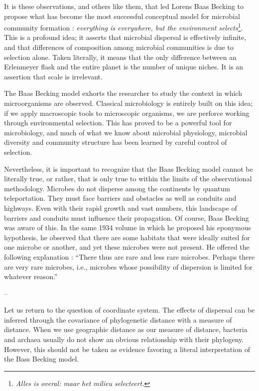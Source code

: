 It is these observations, and others like them, that led Lorens Baas Becking to propose what has become the most successful conceptual model for microbial community formation : {\em everything is everywhere, but the environment selects}\footnote{{\em Alles is overal: maar het milieu selecteert.}}. This is a profound idea; it asserts that microbial dispersal is effectively infinite, and that differences of composition among microbial communities is due to selection alone. Taken literally, it means that the only difference between an Erlenmeyer flask and the entire planet is the number of unique niches. It is an assertion that scale is irrelevant.

The Baas Becking model exhorts the researcher to study the context in which microorganisms are observed. Classical microbiology is entirely built on this idea; if we apply macroscopic tools to microscopic organisms, we are perforce working through environmental selection. This has proved to be a powerful tool for microbiology, and much of what we know about microbial physiology, microbial diversity and community structure has been learned by careful control of selection. 

Nevertheless, it is important to recognize that the Baas Becking model cannot be literally true, or rather, that is only true to within the limits of the observational methodology. Microbes do not disperse among the continents by quantum teleportation. They must face barriers and obstacles as well as conduits and highways. Even with their rapid growth and vast numbers, this landscape of barriers and conduits must influence their propagation. Of course, Baas Becking was aware of this. In the same 1934 volume in which he proposed his eponymous hypothesis, he observed that there are some habitats that were ideally suited for one microbe or another, and yet these microbes were not present. He offered the following explanation : ``There thus are rare and less rare microbes. Perhaps there are very rare microbes, i.e., microbes whose possibility of dispersion is limited for whatever reason.''

--

Let us return to the question of coordinate system. The effects of dispersal can be inferred through the covariance of phylogenetic distance with a measure of distance. When we use geographic distance as our measure of distance, bacteria and archaea usually do not show an obvious relationship with their phylogeny. However, this should not be taken as evidence favoring a literal interpretation of the Bass Becking model.


